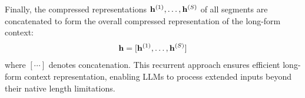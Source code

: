Finally, the compressed representations $\mathbf{h}^{(1)}, \dots, \mathbf{h}^{(S)}$ of all segments are concatenated to form the overall compressed representation of the long-form context:
\begin{align}
    \mathbf{h} = [\mathbf{h}^{(1)}, \dots, \mathbf{h}^{(S)}]
\end{align}
where $[\cdots]$ denotes concatenation. This recurrent approach ensures efficient long-form context representation, enabling LLMs to process extended inputs beyond their native length limitations.




